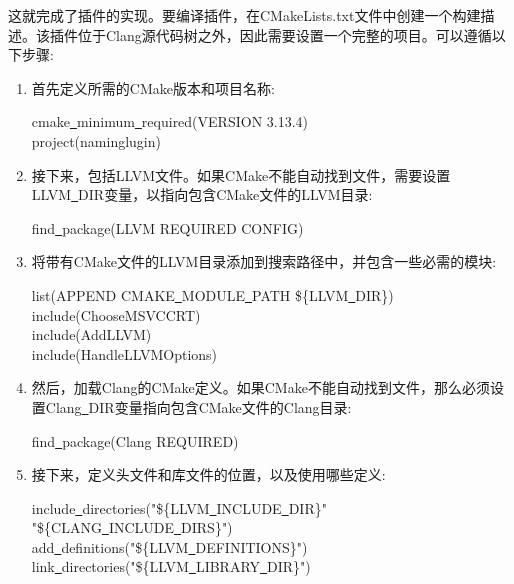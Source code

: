 这就完成了插件的实现。要编译插件，在CMakeLists.txt文件中创建一个构建描述。该插件位于Clang源代码树之外，因此需要设置一个完整的项目。可以遵循以下步骤:\par

\begin{enumerate}
\item 首先定义所需的CMake版本和项目名称:
\begin{tcolorbox}[colback=white,colframe=black]
cmake\underline{~}minimum\underline{~}required(VERSION 3.13.4) \\
project(naminglugin)
\end{tcolorbox}

\item 接下来，包括LLVM文件。如果CMake不能自动找到文件，需要设置LLVM\underline{~}DIR变量，以指向包含CMake文件的LLVM目录:
\begin{tcolorbox}[colback=white,colframe=black]
find\underline{~}package(LLVM REQUIRED CONFIG)
\end{tcolorbox}

\item 将带有CMake文件的LLVM目录添加到搜索路径中，并包含一些必需的模块:
\begin{tcolorbox}[colback=white,colframe=black]
list(APPEND CMAKE\underline{~}MODULE\underline{~}PATH \$\{LLVM\underline{~}DIR\}) \\ 
include(ChooseMSVCCRT) \\
include(AddLLVM) \\
include(HandleLLVMOptions)
\end{tcolorbox}

\item 然后，加载Clang的CMake定义。如果CMake不能自动找到文件，那么必须设置Clang\underline{~}DIR变量指向包含CMake文件的Clang目录:
\begin{tcolorbox}[colback=white,colframe=black]
find\underline{~}package(Clang REQUIRED)
\end{tcolorbox}

\item 接下来，定义头文件和库文件的位置，以及使用哪些定义:
\begin{tcolorbox}[colback=white,colframe=black]
include\underline{~}directories("\$\{LLVM\underline{~}INCLUDE\underline{~}DIR\}" \\
\hspace*{1cm}"\$\{CLANG\underline{~}INCLUDE\underline{~}DIRS\}") \\
add\underline{~}definitions("\$\{LLVM\underline{~}DEFINITIONS\}") \\
link\underline{~}directories("\$\{LLVM\underline{~}LIBRARY\underline{~}DIR\}")
\end{tcolorbox}


\end{enumerate}
